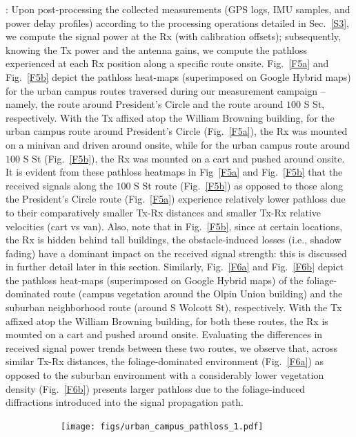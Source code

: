\documentclass[12pt, draftcls, onecolumn]{IEEEtran}
\begin{document}
{: Upon post-processing the collected measurements (GPS logs, IMU samples, and power delay profiles) according to the processing operations detailed in Sec.~\ref{S3}, we compute the signal power at the Rx (with calibration offsets); subsequently, knowing the Tx power and the antenna gains, we compute the pathloss experienced at each Rx position along a specific route onsite. Fig.~\ref{F5a} and Fig.~\ref{F5b} depict the pathloss heat-maps (superimposed on Google Hybrid maps) for the urban campus routes traversed during our measurement campaign -- namely, the route around President's Circle and the route around $100$ S St, respectively. With the Tx affixed atop the William Browning building, for the urban campus route around President's Circle (Fig.~\ref{F5a}), the Rx was mounted on a minivan and driven around onsite, while for the urban campus route around $100$ S St (Fig.~\ref{F5b}), the Rx was mounted on a cart and pushed around onsite. It is evident from these pathloss heatmaps in Fig~\ref{F5a} and Fig.~\ref{F5b} that the received signals along the $100$ S St route (Fig.~\ref{F5b}) as opposed to those along the President's Circle route (Fig.~\ref{F5a}) experience relatively lower pathloss due to their comparatively smaller Tx-Rx distances and smaller Tx-Rx relative velocities (cart vs van). Also, note that in Fig.~\ref{F5b}, since at certain locations, the Rx is hidden behind tall buildings, the obstacle-induced losses (i.e., shadow fading) have a dominant impact on the received signal strength: this is discussed in further detail later in this section. Similarly, Fig.~\ref{F6a} and Fig.~\ref{F6b} depict the pathloss heat-maps (superimposed on Google Hybrid maps) of the foliage-dominated route (campus vegetation around the Olpin Union building) and the suburban neighborhood route (around S Wolcott St), respectively. With the Tx affixed atop the William Browning building, for both these routes, the Rx is mounted on a cart and pushed around onsite. Evaluating the differences in received signal power trends between these two routes, we observe that, across similar Tx-Rx distances, the foliage-dominated environment (Fig.~\ref{F6a}) as opposed to the suburban environment with a considerably lower vegetation density (Fig.~\ref{F6b}) presents larger pathloss due to the foliage-induced diffractions introduced into the signal propagation path.
\begin{figure} [t]
    \centering
    \begin{subfigure}{0.563\linewidth}
        \centering
        \texttt{[image: figs/urban\_campus\_pathloss\_1.pdf]}

\end{subfigure}
\end{figure}}
\end{document}
